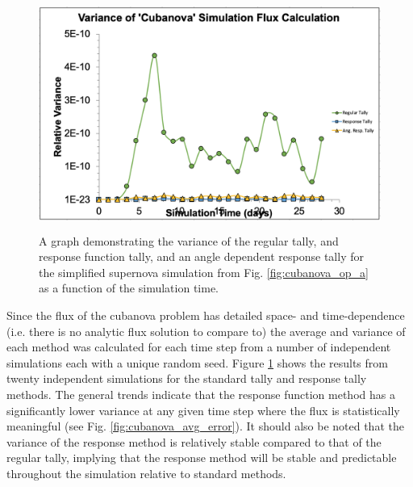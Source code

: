 \documentclass[]{article}
\begin{document}
		\begin{figure} [h!]
			\centering
			\includegraphics[height=3in]{Figures/cubanova_flux_var.png}
			\caption{A graph demonstrating the variance of the regular tally, and response function tally, and an angle dependent response tally for the simplified supernova simulation from Fig. \ref{fig:cubanova_op_a} as a function of the simulation time.}
			\label{fig:cubanova_flux_var}
		\end{figure}
			
		Since the flux of the cubanova problem has detailed space- and time-dependence (i.e. there is no analytic flux solution to compare to) the average and variance of each method was calculated for each time step from a number of independent simulations each with a unique random seed. Figure \ref{fig:cubanova_flux_var} shows the results from twenty independent simulations for the standard tally and response tally methods. The general trends indicate that the response function method has a significantly lower variance at any given time step where the flux is statistically meaningful (see Fig. \ref{fig:cubanova_avg_error}). It should also be noted that the variance of the response method is relatively stable compared to that of the regular tally, implying that the response method will be stable and predictable throughout the simulation relative to standard methods. 
		
\end{document}
